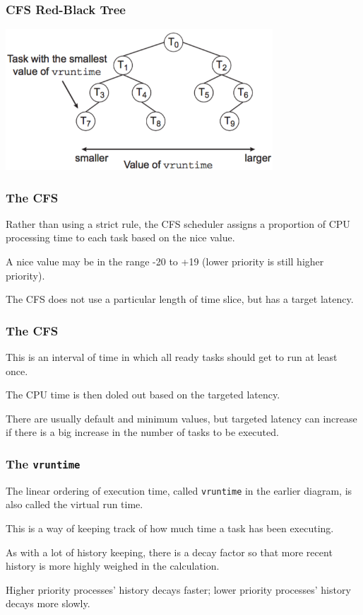 \begin{frame}
\frametitle{CFS Red-Black Tree}

\begin{center}
	\includegraphics[width=0.75\textwidth]{images/cfs.png}
\end{center}


\end{frame}

\begin{frame}
\frametitle{The CFS}

Rather than using a strict rule, the CFS scheduler assigns a proportion of CPU processing time to each task based on the nice value. 

A nice value may be in the range -20 to +19 (lower priority is still higher priority).

The CFS does not use a particular length of time slice, but has a \alert{target latency}.

\end{frame}

\begin{frame}
\frametitle{The CFS}

This is an interval of time in which all ready tasks should get to run at least once. 

The CPU time is then doled out based on the targeted latency. 

There are usually default and minimum values, but targeted latency can increase if there is a big increase in the number of tasks to be executed.

\end{frame}

\begin{frame}
\frametitle{The \texttt{vruntime}}

The linear ordering of execution time, called \texttt{vruntime} in the earlier diagram, is also called the \alert{virtual run time}.

 This is a way of keeping track of how much time a task has been executing. 
 
 As with a lot of history keeping, there is a decay factor so that more recent history is more highly weighed in the calculation. 
 
 Higher priority processes' history decays faster; lower priority processes' history decays more slowly. 
 

\end{frame}

